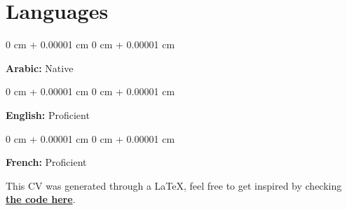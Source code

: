 \documentclass[10pt, letterpaper]{article}
\newenvironment{onecolentry}{ \begin{adjustwidth}{ 0 cm + 0.00001 cm }{ 0 cm + 0.00001 cm }
}{ \end{adjustwidth} } %
\begin{document}
	\section{Languages}

	\begin{onecolentry}
		\textbf{Arabic:} Native
	\end{onecolentry}

	\vspace{0.2 cm}

	\begin{onecolentry}
		\textbf{English:} Proficient
	\end{onecolentry}
		
	\vspace{0.2 cm}
	\begin{onecolentry}
		\textbf{French:} Proficient
	\end{onecolentry}

	\vspace*{\fill}

	{\small This CV was generated through a LaTeX, feel free to get inspired by checking {\href{https://github.com/wadhah101/mycv/}{\textbf{the code here}}}.}   
\end{document}
